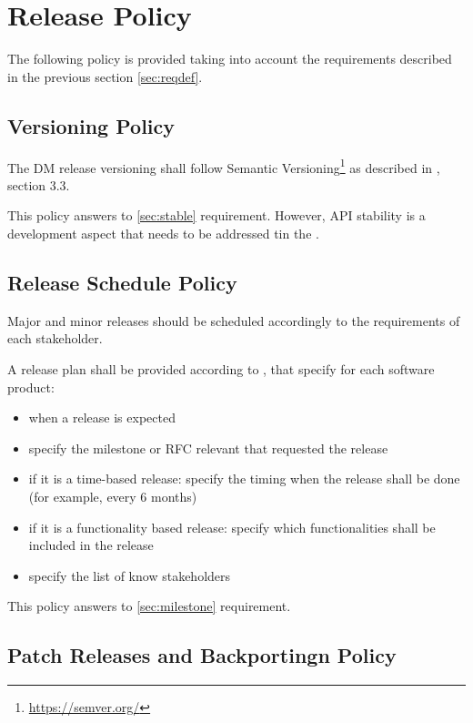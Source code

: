 \section{Release Policy} \label{sec:policy}

The following policy is provided taking into account the requirements described in the previous section \ref{sec:reqdef}.


\subsection{Versioning Policy} \label{sec:versinopolicy}

The DM release versioning shall follow Semantic Versioning\footnote{\url{https://semver.org/}} as described in , section 3.3.

This policy answers to \ref{sec:stable} requirement.
However, API stability is a development aspect that needs to be addressed tin the .


\subsection{Release Schedule Policy} \label{sec:schedulepolicy}

Major and minor releases should be scheduled accordingly to the requirements of each stakeholder.

A release plan shall be provided according to , that specify for each software product:

\begin{itemize}
\item when a release is expected
\item specify the milestone or RFC relevant that requested the release
\item if it is a time-based release: specify the timing when the release shall be done (for example, every 6 months)
\item if it is a functionality based release: specify which functionalities shall be included in the release
\item specify the list of know stakeholders
\end{itemize}

This policy answers to \ref{sec:milestone} requirement.


\subsection{Patch Releases and Backportingn Policy} \label{sec:patchpolicy}

